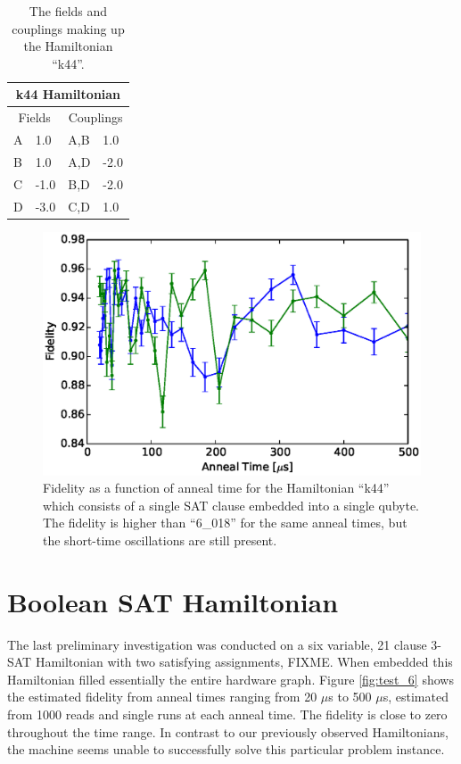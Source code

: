 \begin{table}
	\begin{center}
\begin{tabular}{ | l | l | l | l |}
	\hline
	\multicolumn{4}{|c|}{k44 Hamiltonian} \\ \hline
	\multicolumn{2}{|c|}{Fields} & \multicolumn{2}{c|}{Couplings} \\ \hline
	A & 1.0 & A,B & 1.0 \\
	B & 1.0 & A,D & -2.0 \\
	C & -1.0 & B,D & -2.0 \\
	D & -3.0 & C,D & 1.0 \\ \hline
\end{tabular}
\end{center}
\caption[k44 Hamiltonian]{The fields and couplings making up the Hamiltonian ``k44''.}
\end{table}

\begin{figure}
	\includegraphics{img/k44.eps}
	\caption[Single K44 Fidelity]{Fidelity as a function of anneal time for the Hamiltonian ``k44'' which consists of a single SAT clause embedded into a single qubyte.  The fidelity is higher than ``6\_018'' for the same anneal times, but the short-time oscillations are still present.}
	\label{fig:k44_comparison}
\end{figure}

\section{Boolean SAT Hamiltonian}
The last preliminary investigation was conducted on a six variable, 21 clause 3-SAT Hamiltonian with two satisfying assignments, FIXME.  When embedded this Hamiltonian filled essentially the entire hardware graph.  Figure \ref{fig:test_6} shows the estimated fidelity from anneal times ranging from 20 $\mu$s to 500 $\mu$s, estimated from 1000 reads and single runs at each anneal time.  The fidelity is close to zero throughout the time range.  In contrast to our previously observed Hamiltonians, the \machine machine seems unable to successfully solve this particular problem instance.  

